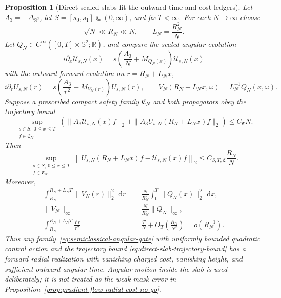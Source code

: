 \documentclass[11pt]{article}
\newtheorem{proposition}[theorem]{Proposition}
\theoremstyle{remark}
\newcommand{\dd}{\,\mathrm d}
\begin{document}
\begin{proposition}[Direct scaled slabs fit the outward time and cost ledgers]
\label{prop:direct-scaled-slab}
Let $A_3=-\Delta_{\mathbb S^2}$, let
$S=[s_0,s_1]\Subset(0,\infty)$, and fix $T<\infty$.  For each $N\to\infty$
choose
\begin{equation}
 \sqrt N\ll R_N\ll N,
 \qquad
 L_N=\frac{R_N^2}{N}.
 \label{eq:direct-slab-scale-window}
\end{equation}
Let $Q_N\in C^\infty([0,T]\times\mathbb S^2;\mathbb R)$, and compare the
scaled angular evolution
\begin{equation}
 i\partial_x\mathcal U_{s,N}(x)
 =
 s\left(\frac{A_3}{N}+M_{Q_N(x)}\right)
 \mathcal U_{s,N}(x)
 \label{eq:semiclassical-angular-gate}
\end{equation}
with the outward forward evolution on
$r=R_N+L_Nx$,
\begin{equation}
 i\partial_r U_{s,N}(r)
 =
 s\left(\frac{A_3}{r^2}+M_{V_N(r)}\right)U_{s,N}(r),
 \qquad
 V_N(R_N+L_Nx,\omega)=L_N^{-1}Q_N(x,\omega).
 \label{eq:direct-radial-slab}
\end{equation}
Suppose a prescribed compact safety family $\mathfrak C_N$ and both
propagators obey the trajectory bound
\begin{equation}
 \sup_{\substack{s\in S,\ 0\leq x\leq T\\f\in\mathfrak C_N}}
 \left(
  \|A_3\mathcal U_{s,N}(x)f\|_2+
  \|A_3U_{s,N}(R_N+L_Nx)f\|_2
 \right)
 \leq C_{\mathfrak C}N.
 \label{eq:direct-slab-trajectory-bound}
\end{equation}
Then
\begin{equation}
 \sup_{\substack{s\in S,\ 0\leq x\leq T\\f\in\mathfrak C_N}}
 \left\|
 U_{s,N}(R_N+L_Nx)f-\mathcal U_{s,N}(x)f
 \right\|_2
 \leq C_{S,T,\mathfrak C}\frac{R_N}{N}.
 \label{eq:direct-slab-forward-error}
\end{equation}
Moreover,
\begin{align}
 \int_{R_N}^{R_N+L_NT}\|V_N(r)\|_2^2\,\dd r
 &=
 \frac{N}{R_N^2}
 \int_0^T\|Q_N(x)\|_2^2\,\dd x,
 \label{eq:direct-slab-cost}\\
 \|V_N\|_\infty
 &=
 \frac{N}{R_N^2}\|Q_N\|_\infty,
 \label{eq:direct-slab-height}\\
 \int_{R_N}^{R_N+L_NT}\frac{\dd r}{r^2}
 &=
 \frac{T}{N}+O_T\!\left(\frac{R_N}{N^2}\right)
 =
 o(R_N^{-1}).
 \label{eq:direct-slab-angular-time}
\end{align}
Thus any family~\eqref{eq:semiclassical-angular-gate} with uniformly bounded
quadratic control action and the trajectory bound
\eqref{eq:direct-slab-trajectory-bound} has a forward radial realization
with vanishing charged cost, vanishing height, and sufficient outward
angular time.  Angular motion inside the slab is used deliberately; it is
not treated as the weak-mask error in
Proposition~\ref{prop:gradient-flow-radial-cost-no-go}.
\end{proposition}
\end{document}
